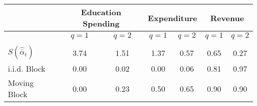 \begin{tabular}{@{}lcccccc@{}}
	\toprule 
	& \multicolumn{2}{c}{ Education Spending } & \multicolumn{2}{c}{ Expenditure } & \multicolumn{2}{c}{ Revenue } \\
	\hline
	& $q=1$ & $q=2$ & $q=1$ & $q=2$ & $q=1$ & $q=2$ \\
	\hline \\
	$S (\hat{\bar{\alpha}}_{t})$ & 3.74 & 1.51 & 1.37 & 0.57 & 0.65 & 0.27\vspace{2mm}\\
	i.i.d. Block & 0.00 & 0.02 & 0.00 & 0.06 & 0.81 & 0.97\\
	Moving Block & 0.00 & 0.23 & 0.50 & 0.65 & 0.90 & 0.90 \\
	\bottomrule
\end{tabular}
